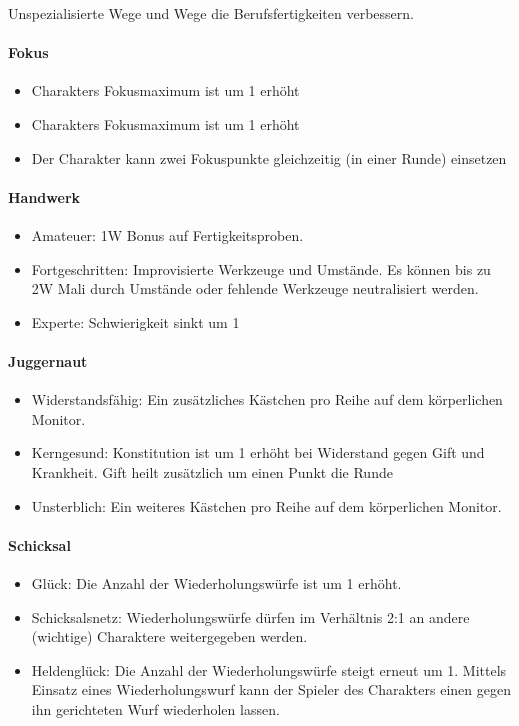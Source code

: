 \documentclass{article}
\begin{document}
Unspezialisierte Wege und Wege die Berufsfertigkeiten verbessern.

\paragraph{Fokus}

\begin{itemize}
\item Charakters Fokusmaximum ist um 1 erhöht
\item Charakters Fokusmaximum ist um 1 erhöht
\item Der Charakter kann zwei Fokuspunkte gleichzeitig (in einer Runde) einsetzen
\end{itemize}

\paragraph{Handwerk}

\begin{itemize}
\item Amateuer: 1W Bonus auf Fertigkeitsproben.
\item Fortgeschritten: Improvisierte Werkzeuge und Umstände. Es können bis zu 2W Mali durch Umstände oder fehlende Werkzeuge neutralisiert werden.
\item Experte: Schwierigkeit sinkt um 1
\end{itemize}

\paragraph{Juggernaut}

\begin{itemize}
\item Widerstandsfähig: Ein zusätzliches Kästchen pro Reihe auf dem körperlichen Monitor.
\item Kerngesund: Konstitution ist um 1 erhöht bei Widerstand gegen Gift und Krankheit. Gift heilt zusätzlich um einen Punkt die Runde
\item Unsterblich: Ein weiteres Kästchen pro Reihe auf dem körperlichen Monitor.
\end{itemize}

\paragraph{Schicksal}

\begin{itemize}
\item Glück: Die Anzahl der Wiederholungswürfe ist um 1 erhöht.
\item Schicksalsnetz: Wiederholungswürfe dürfen im Verhältnis 2:1 an andere (wichtige) Charaktere weitergegeben werden.
\item Heldenglück: Die Anzahl der Wiederholungswürfe steigt erneut um 1. Mittels Einsatz eines Wiederholungswurf kann der Spieler des Charakters einen gegen ihn gerichteten Wurf wiederholen lassen.
\end{itemize}
\end{document}
